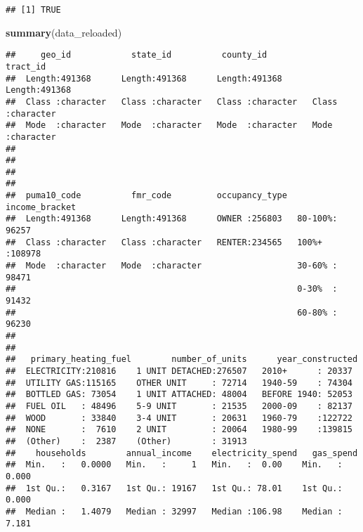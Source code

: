 \documentclass[]{article}
\newenvironment{Shaded}{\begin{snugshade}}{\end{snugshade}}
\newcommand{\KeywordTok}[1]{\textcolor[rgb]{0.13,0.29,0.53}{\textbf{#1}}}
\newcommand{\NormalTok}[1]{#1}
\begin{document}
\begin{verbatim}
## [1] TRUE
\end{verbatim}

\begin{Shaded}
\begin{Highlighting}[]
\KeywordTok{summary}\NormalTok{(data_reloaded)}
\end{Highlighting}
\end{Shaded}

\begin{verbatim}
##     geo_id            state_id          county_id           tract_id        
##  Length:491368      Length:491368      Length:491368      Length:491368     
##  Class :character   Class :character   Class :character   Class :character  
##  Mode  :character   Mode  :character   Mode  :character   Mode  :character  
##                                                                             
##                                                                             
##                                                                             
##                                                                             
##  puma10_code          fmr_code         occupancy_type  income_bracket  
##  Length:491368      Length:491368      OWNER :256803   80-100%: 96257  
##  Class :character   Class :character   RENTER:234565   100%+  :108978  
##  Mode  :character   Mode  :character                   30-60% : 98471  
##                                                        0-30%  : 91432  
##                                                        60-80% : 96230  
##                                                                        
##                                                                        
##   primary_heating_fuel        number_of_units      year_constructed 
##  ELECTRICITY:210816    1 UNIT DETACHED:276507   2010+      : 20337  
##  UTILITY GAS:115165    OTHER UNIT     : 72714   1940-59    : 74304  
##  BOTTLED GAS: 73054    1 UNIT ATTACHED: 48004   BEFORE 1940: 52053  
##  FUEL OIL   : 48496    5-9 UNIT       : 21535   2000-09    : 82137  
##  WOOD       : 33840    3-4 UNIT       : 20631   1960-79    :122722  
##  NONE       :  7610    2 UNIT         : 20064   1980-99    :139815  
##  (Other)    :  2387    (Other)        : 31913                       
##    households        annual_income    electricity_spend   gas_spend      
##  Min.   :   0.0000   Min.   :     1   Min.   :  0.00    Min.   :  0.000  
##  1st Qu.:   0.3167   1st Qu.: 19167   1st Qu.: 78.01    1st Qu.:  0.000  
##  Median :   1.4079   Median : 32997   Median :106.98    Median :  7.181  

\end{verbatim}
\end{document}
